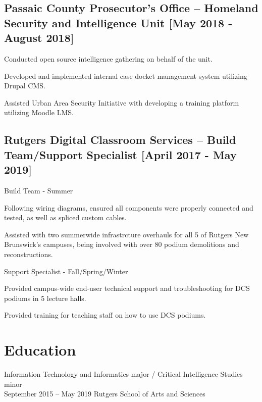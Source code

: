 \documentclass{article}
\begin{document}
\begin{samepage}
\subsection{Passaic County Prosecutor's Office -- Homeland Security and Intelligence Unit [May 2018 - August 2018]}
\begin{compactitem}
	\item Conducted open source intelligence gathering on behalf of the unit.
	\item Developed and implemented internal case docket management system utilizing Drupal CMS.
	\item Assisted Urban Area Security Initiative with developing a training platform utilizing Moodle LMS.
\end{compactitem}
\subsection{Rutgers Digital Classroom Services -- Build Team/Support Specialist [April 2017 - May 2019]}
\begin{compactitem}
\item Build Team - Summer
	\begin{compactitem}
		\item Following wiring diagrams, ensured all components were properly connected and tested, as well as spliced custom cables.
		\item Assisted with two summerwide infrastrcture overhauls for all 5 of Rutgers New Brunswick's campuses, being involved with over 80 podium demolitions and reconstructions.
	\end{compactitem}
\item Support Specialist - Fall/Spring/Winter
	\begin{compactitem}
		\item Provided campus-wide end-user technical support and troubleshooting for DCS podiums in 5 lecture halls.
		\item Provided training for teaching staff on how to use DCS podiums.
	\end{compactitem}
\end{compactitem}

\section{Education}
Information Technology and Informatics major /
Critical Intelligence Studies minor \\
September 2015 -- May 2019
Rutgers School of Arts and Sciences


\end{samepage}
\end{document}
